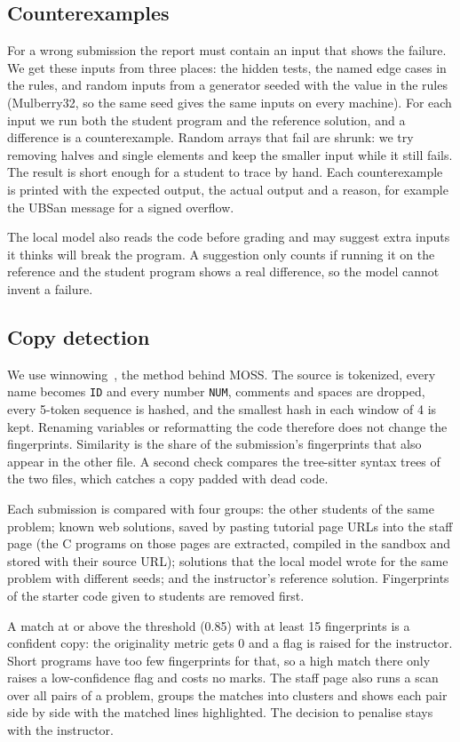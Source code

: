 \documentclass[conference]{IEEEtran}
\newcommand{\code}[1]{\texttt{#1}}
\begin{document}
\subsection{Counterexamples}
For a wrong submission the report must contain an input that shows the failure. We get these
inputs from three places: the hidden tests, the named edge cases in the rules, and random
inputs from a generator seeded with the value in the rules (Mulberry32, so the same seed gives
the same inputs on every machine). For each input we run both the student program and the
reference solution, and a difference is a counterexample. Random arrays that fail are shrunk:
we try removing halves and single elements and keep the smaller input while it still fails.
The result is short enough for a student to trace by hand. Each counterexample is printed with the expected output, the actual output and a reason,
for example the UBSan message for a signed overflow.

The local model also reads the code before grading and may suggest extra inputs it thinks will
break the program. A suggestion only counts if running it on the reference and the student
program shows a real difference, so the model cannot invent a failure.

\subsection{Copy detection}\label{sec:copy}
We use winnowing~\cite{schleimer2003}, the method behind MOSS. The source is tokenized, every
name becomes \code{ID} and every number \code{NUM}, comments and spaces are dropped, every
5-token sequence is hashed, and the smallest hash in each window of 4 is kept. Renaming variables
or reformatting the code therefore does not change the fingerprints. Similarity is the share
of the submission's fingerprints that also appear in the other file. A second check compares
the tree-sitter syntax trees of the two files, which catches a copy padded with dead code.

Each submission is compared with four groups: the other students of the same problem; known
web solutions, saved by pasting tutorial page URLs into the staff page (the C programs on those
pages are extracted, compiled in the sandbox and stored with their source URL); solutions that
the local model wrote for the same problem with different seeds; and the instructor's reference
solution. Fingerprints of the starter code given to students are removed first.

A match at or above the threshold (0.85) with at least 15 fingerprints is a confident copy: the
originality metric gets 0 and a flag is raised for the instructor. Short programs have too few
fingerprints for that, so a high match there only raises a low-confidence flag and costs no
marks. The staff page also runs a scan over all pairs of a problem, groups the matches into
clusters and shows each pair side by side with the matched lines highlighted. The decision to
penalise stays with the instructor.
\end{document}
